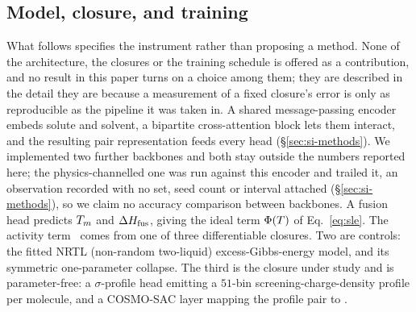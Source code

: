 \subsection{Model, closure, and training}
\label{sec:model}
What follows specifies the instrument rather than proposing a method. None of the architecture, the
closures or the training schedule is offered as a contribution, and no result in this paper turns on
a choice among them; they are described in the detail they are because a measurement of a fixed
closure's error is only as reproducible as the pipeline it was taken in.
A shared message-passing encoder embeds solute and solvent, a bipartite cross-attention block lets
them interact, and the resulting pair representation feeds every head (\S\ref{sec:si-methods}). We
implemented two further backbones and both stay outside the numbers reported here; the
physics-channelled one was run against this encoder and trailed it, an observation recorded with no
set, seed count or interval attached (\S\ref{sec:si-methods}), so we claim no accuracy comparison
between backbones. A fusion head predicts $T_m$ and $\Delta H_{\mathrm{fus}}$, giving the ideal term $\Phi(T)$ of
Eq.~\eqref{eq:sle}. The activity term \lng\ comes from one of three differentiable closures. Two are
controls: the fitted NRTL (non-random two-liquid) excess-Gibbs-energy model, and its symmetric
one-parameter collapse. The third is the closure under study and is parameter-free: a $\sigma$-profile
head emitting a $51$-bin screening-charge-density profile per molecule, and a COSMO-SAC layer
mapping the profile pair to \lng.

